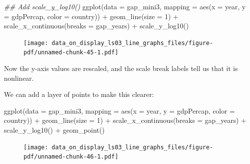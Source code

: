 \documentclass[
  letterpaper,
  DIV=11,
  numbers=noendperiod]{scrreprt}
\newenvironment{Shaded}{\begin{snugshade}}{\end{snugshade}}
\newcommand{\AttributeTok}[1]{\textcolor[rgb]{0.40,0.45,0.13}{#1}}
\newcommand{\DecValTok}[1]{\textcolor[rgb]{0.68,0.00,0.00}{#1}}
\newcommand{\DocumentationTok}[1]{\textcolor[rgb]{0.37,0.37,0.37}{\textit{#1}}}
\newcommand{\FunctionTok}[1]{\textcolor[rgb]{0.28,0.35,0.67}{#1}}
\newcommand{\NormalTok}[1]{\textcolor[rgb]{0.00,0.23,0.31}{#1}}
\newcommand{\SpecialCharTok}[1]{\textcolor[rgb]{0.37,0.37,0.37}{#1}}
\begin{document}
\begin{Shaded}
\begin{Highlighting}[]
\DocumentationTok{\#\# Add scale\_y\_log10()}
\FunctionTok{ggplot}\NormalTok{(}\AttributeTok{data =}\NormalTok{ gap\_mini3, }
       \AttributeTok{mapping =} \FunctionTok{aes}\NormalTok{(}\AttributeTok{x =}\NormalTok{ year, }
                     \AttributeTok{y =}\NormalTok{ gdpPercap, }
                     \AttributeTok{color =}\NormalTok{ country)) }\SpecialCharTok{+}
  \FunctionTok{geom\_line}\NormalTok{(}\AttributeTok{size =} \DecValTok{1}\NormalTok{) }\SpecialCharTok{+}
  \FunctionTok{scale\_x\_continuous}\NormalTok{(}\AttributeTok{breaks =}\NormalTok{ gap\_years) }\SpecialCharTok{+}
  \FunctionTok{scale\_y\_log10}\NormalTok{()}
\end{Highlighting}
\end{Shaded}

\begin{figure}[H]

{\centering \texttt{[image: data\_on\_display\_ls03\_line\_graphs\_files/figure-pdf/unnamed-chunk-45-1.pdf]}

}

\end{figure}

Now the y-axis values are rescaled, and the scale break labels tell us
that it is nonlinear.

We can add a layer of points to make this clearer:

\begin{Shaded}
\begin{Highlighting}[]
\FunctionTok{ggplot}\NormalTok{(}\AttributeTok{data =}\NormalTok{ gap\_mini3, }
       \AttributeTok{mapping =} \FunctionTok{aes}\NormalTok{(}\AttributeTok{x =}\NormalTok{ year, }
                     \AttributeTok{y =}\NormalTok{ gdpPercap, }
                     \AttributeTok{color =}\NormalTok{ country)) }\SpecialCharTok{+}
  \FunctionTok{geom\_line}\NormalTok{(}\AttributeTok{size =} \DecValTok{1}\NormalTok{) }\SpecialCharTok{+}
  \FunctionTok{scale\_x\_continuous}\NormalTok{(}\AttributeTok{breaks =}\NormalTok{ gap\_years) }\SpecialCharTok{+}
  \FunctionTok{scale\_y\_log10}\NormalTok{() }\SpecialCharTok{+}
  \FunctionTok{geom\_point}\NormalTok{()}
\end{Highlighting}
\end{Shaded}

\begin{figure}[H]

{\centering \texttt{[image: data\_on\_display\_ls03\_line\_graphs\_files/figure-pdf/unnamed-chunk-46-1.pdf]}

}

\end{figure}
\end{document}
